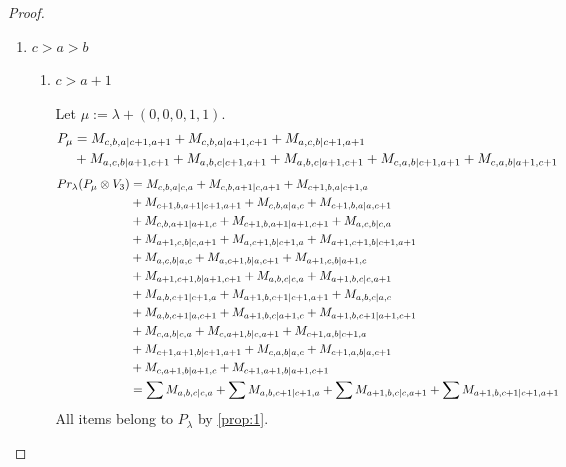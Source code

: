 \begin{proof}
\begin{enumerate}
  \item $c>a>b$ 
    \begin{enumerate}
      \item $c>a+1$ \par
        Let $\mu:=\lambda + (0,0,0,1,1) $.
        \begin{equation}\notag
          \begin{aligned}
            P_\mu &= M_{c,b,a|c+1,a+1}
+ M_{c,b,a|a+1,c+1}
+ M_{a,c,b|c+1,a+1}\\
                        &
+ M_{a,c,b|a+1,c+1}
+ M_{a,b,c|c+1,a+1}
+ M_{a,b,c|a+1,c+1}
+ M_{c,a,b|c+1,a+1}
+ M_{c,a,b|a+1,c+1}
          \end{aligned}
        \end{equation}
        \begin{equation}\notag
          \begin{aligned}
            Pr_{\lambda}(P_\mu \otimes V_{3}) &=
M_{c,b,a|c,a}
+ M_{c,b,a+1|c,a+1}
+ M_{c+1,b,a|c+1,a}\\ 
                                              &
+ M_{c+1,b,a+1|c+1,a+1}
+ M_{c,b,a|a,c}
+ M_{c+1,b,a|a,c+1}\\ 
                                              &
+ M_{c,b,a+1|a+1,c}
+ M_{c+1,b,a+1|a+1,c+1}
+ M_{a,c,b|c,a}\\ 
                                              &
+ M_{a+1,c,b|c,a+1}
+ M_{a,c+1,b|c+1,a}
+ M_{a+1,c+1,b|c+1,a+1}\\ 
                                              &
+ M_{a,c,b|a,c}
+ M_{a,c+1,b|a,c+1}
+ M_{a+1,c,b|a+1,c}\\ 
                                              &
+ M_{a+1,c+1,b|a+1,c+1}
+ M_{a,b,c|c,a}
+ M_{a+1,b,c|c,a+1}\\ 
                                              &
+ M_{a,b,c+1|c+1,a}
+ M_{a+1,b,c+1|c+1,a+1}
+ M_{a,b,c|a,c}\\ 
                                              &
+ M_{a,b,c+1|a,c+1}
+ M_{a+1,b,c|a+1,c}
+ M_{a+1,b,c+1|a+1,c+1}\\ 
                                              &
+ M_{c,a,b|c,a}
+ M_{c,a+1,b|c,a+1}
+ M_{c+1,a,b|c+1,a}\\ 
                                              &
+ M_{c+1,a+1,b|c+1,a+1}
+ M_{c,a,b|a,c}
+ M_{c+1,a,b|a,c+1}\\ 
                                              &
+ M_{c,a+1,b|a+1,c}
+ M_{c+1,a+1,b|a+1,c+1} \\
                                               &=
\sum M_{a,b,c|c,a}
+ \sum M_{a,b,c+1|c+1,a}
+ \sum M_{a+1,b,c|c,a+1}
+ \sum M_{a+1,b,c+1|c+1,a+1}
          \end{aligned}
        \end{equation}
All items belong to $P_\lambda$ by \cref{prop:1}.


\end{enumerate}
\end{enumerate}
\end{proof}
